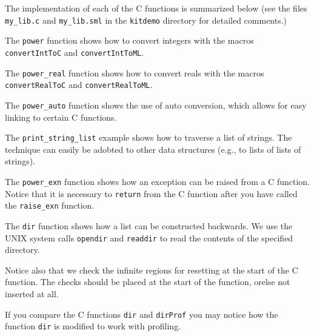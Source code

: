 \documentclass[12pt]{book}
\begin{document}
The implementation of each of the C functions is summarized below (see
the files \verb|my_lib.c| and \verb|my_lib.sml| in the {\tt kitdemo}
directory for detailed comments.)

\begin{example}\label{power.ex}
  The \texttt{power} function shows how to convert
  integers with the macros \texttt{convertIntToC} and
  \texttt{convertIntToML}.
\end{example}

\begin{example}\label{power_real.ex}
  The \texttt{power\_real} function shows how
  to convert reals with the macros \texttt{convertRealToC} and
  \texttt{convertRealToML}.
\end{example}

\begin{example}\label{power_auto.ex}
  The \texttt{power\_auto} function shows the
  use of auto conversion, which allows for easy linking to certain C
  functions.
\end{example}

\begin{example}\label{print_string_list.ex}
  The \texttt{print\_string\_list}
  example shows how to traverse a list of strings. The technique can
  easily be adobted to other data structures (e.g., to lists of lists
  of strings).
\end{example}

\begin{example}\label{power_exn.ex}
  The \texttt{power\_exn} function shows how an
  exception can be raised from a C function. Notice that it is
  necessary to {\tt return} from the C function after you have called
  the \verb|raise_exn| function.
\end{example}

\begin{example}\label{dir.ex}
  The \texttt{dir} function shows how a list can be
  constructed backwards.  We use the UNIX system calls
  \texttt{opendir} and \texttt{readdir} to read the contents of the
  specified directory.
  
  Notice also that we check the infinite regions for resetting at the
  start of the C function. The checks should be placed at the start of
  the function, orelse not inserted at all.
  
  If you compare the C functions \texttt{dir} and \texttt{dirProf} you may
  notice how the function \texttt{dir} is modified to work with
  profiling.
\end{example}
\end{document}
